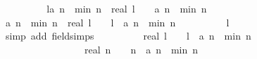 \begin{isabellebody}
\ \ \ \ \ \ \isamarkupfalse%
\ \isamarkupfalse%
\ {\isachardoublequoteopen}l{\isacharasterisk}{\isacharparenleft}a\ {\isacharparenleft}n{\isacharminus}{}{\isacharparenright}\ {\isacharminus}\ {\isacharquery}min\ n{\isacharparenright}\ {\isasymle}\ {\isacharparenleft}real\ l\ {\isacharminus}\ {}{\isacharparenright}\ {\isacharasterisk}\ {\isacharparenleft}a\ {\isacharparenleft}n{\isacharminus}{}{\isacharparenright}\ {\isacharminus}\ {\isacharquery}min\ {\isacharparenleft}n\ {\isacharminus}\ {}{\isacharparenright}{\isacharparenright}{\isachardoublequoteclose}\isanewline
\ \ \ \ \ \ \ \ \isacommand{{\isachardot}}\isamarkupfalse%
\isanewline
\ \ \ \ \ \ \isamarkupfalse%
\ {\isachardoublequoteopen}a\ {\isacharparenleft}n{\isacharminus}{}{\isacharparenright}\ {\isacharminus}\ {\isacharquery}min\ n\ {\isasymle}\ {\isacharparenleft}real\ l\ {\isacharminus}\ {}{\isacharparenright}\ {\isacharslash}\ l\ {\isacharasterisk}\ {\isacharparenleft}a\ {\isacharparenleft}n{\isacharminus}{}{\isacharparenright}\ {\isacharminus}\ {\isacharquery}min\ {\isacharparenleft}n{\isacharminus}{}{\isacharparenright}{\isacharparenright}{\isachardoublequoteclose}\isanewline
\ \ \ \ \ \ \ \ \isamarkupfalse%
\ {\isacharbackquoteopen}l\ {\isasymge}\ {}{\isacharbackquoteclose}\isanewline
\ \ \ \ \ \ \ \ \isamarkupfalse%
\ {\isacharparenleft}simp\ add{\isacharcolon}\ field{\isacharunderscore}simps{\isacharparenright}\isanewline
\ \ \ \ \ \ \isamarkupfalse%
\ \isamarkupfalse%
\ {\isachardoublequoteopen}{\isacharparenleft}real\ l\ {\isacharminus}\ {}{\isacharparenright}\ {\isacharslash}\ l\ {\isacharasterisk}\ {\isacharparenleft}a\ {\isacharparenleft}n{\isacharminus}{}{\isacharparenright}\ {\isacharminus}\ {\isacharquery}min\ {\isacharparenleft}n{\isacharminus}{}{\isacharparenright}{\isacharparenright}\ {\isasymle}\ \isanewline
\ \ \ \ \ \ \ \ \ \ \ \ \ \ \ \ \ {\isacharparenleft}real\ n\ {\isacharminus}\ {}{\isacharparenright}\ {\isacharslash}\ n\ {\isacharasterisk}\ {\isacharparenleft}a\ {\isacharparenleft}n{\isacharminus}{}{\isacharparenright}\ {\isacharminus}\ {\isacharquery}min\ {\isacharparenleft}n{\isacharminus}{}{\isacharparenright}{\isacharparenright}{\isachardoublequoteclose}\isanewline
\ \ \ \ \ \ \isamarkupfalse%
{\isacharminus}\isanewline
\ \ \ \ \ \ \ \ \isamarkupfalse%

\end{isabellebody}
